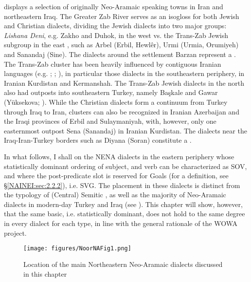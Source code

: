 \documentclass[output=paper,colorlinks,citecolor=brown,draftmode]{langscibook}
\begin{document}
 displays a selection of originally Neo-Aramaic speaking towns in Iran and northeastern Iraq. The Greater Zab River serves as an isogloss for both Jewish and Christian dialects, dividing the Jewish dialects into two major groups: \textit{Lishana Deni}, e.g. Zakho and Duhok, in the west vs. the Trans-Zab Jewish subgroup in the east \parencite{Mutzafi2008TransZab}, such as Arbel (Erbil, Hewlêr), Urmi (Urmia, Orumiyeh) and Sanandaj (Sine). The dialects around the settlement Barzan represent a . The Trans-Zab cluster has been heavily influenced by contiguous Iranian languages (e.g. \citealt{Kapeliuk2004IrTuArAr}; \citealt{Noorlander2014Diversity}; \citealt{Khan2020ContactChange}), in particular those dialects in the southeastern periphery, in Iranian Kurdistan and Kermanshah. The Trans-Zab Jewish dialects in the north also had outposts into southeastern Turkey, namely Başkale and Gawar (Yüksekova; \citealt{Garbell1065a}). While the Christian dialects form a continuum from Turkey through Iraq to Iran, clusters can also be recognized in Iranian Azerbaijan and the Iraqi provinces of Erbil and Sulaymaniyah, with, however, only one easternmost outpost Sena (Sanandaj) in Iranian Kurdistan. The dialects near the Iraq-Iran-Turkey borders such as Diyana (Soran) constitute a .

\largerpage[2]
In what follows, I shall  on the NENA dialects in the eastern periphery whose statistically dominant ordering of subject,  and verb can be characterized as SOV, and where the post-predicate slot is reserved for Goals (for a definition, see §\ref{NAINEI:sec:2.2.2}), i.e. SVG. The  placement in these dialects is distinct from the typology of (Central) Semitic , as well as the majority of Neo-Aramaic dialects in modern-day Turkey and Iraq (see ). This chapter will show, however, that the same basic, i.e. statistically dominant,  does not hold to the same degree in every dialect for each  type, in line with the general rationale of the WOWA project.

\begin{figure}[t]
    \texttt{[image: figures/NoorNAFig1.png]}
    \caption{Location of the main Northeastern Neo-Aramaic dialects discussed in this chapter}
    \label{NAINEI:fig:1}
\end{figure}
\end{document}
